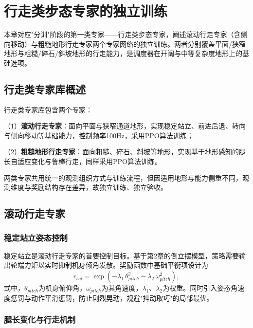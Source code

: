 
\chapter[行走类步态专家的独立训练]{行走类步态专家的独立训练}
\label{cha:walking-experts}

本章对应"分训"阶段的第一类专家——行走类步态专家，阐述滚动行走专家（含侧向移动）与粗糙地形行走专家两个专家网络的独立训练。两者分别覆盖平面/狭窄地形与粗糙/碎石/斜坡地形的行走能力，是调度器在开阔与中等复杂度地形上的基础选项。

\section{行走类专家库概述}

行走类专家库包含两个专家：

（1）\textbf{滚动行走专家}：面向平面与狭窄通道地形，实现稳定站立、前进后退、转向与侧向移动等基础能力，控制频率100Hz，采用PPO算法训练；

（2）\textbf{粗糙地形行走专家}：面向粗糙、碎石、斜坡等地形，实现基于地形感知的腿长自适应变化与鲁棒行走，同样采用PPO算法训练。

两类专家共用统一的观测组织方式与训练流程，但因适用地形与能力侧重不同，观测维度与奖励结构存在差异，故独立训练、独立验收。

\section{滚动行走专家}

\subsection{稳定站立姿态控制}

稳定站立是滚动行走专家的首要控制目标。基于第2章的倒立摆模型，策略需要输出轮端力矩以实时抑制机身倾角发散。奖励函数中基础平衡项设计为
\begin{equation}
  r_{bal} = \exp\left(-\lambda_1\,\theta_{pitch}^2 - \lambda_2\,\omega_{pitch}^2\right),
  \label{eq:rbal}
\end{equation}
式中，$\theta_{pitch}$为机身俯仰角，$\omega_{pitch}$为其角速度，$\lambda_1$、$\lambda_2$为权重。同时引入姿态角速度惩罚与动作平滑惩罚，防止剧烈晃动，规避"抖动取巧"的局部最优。

\subsection{腿长变化与行走机制}

